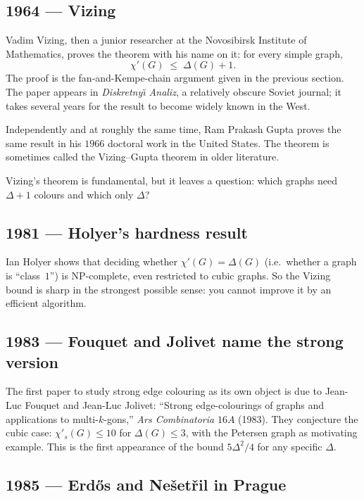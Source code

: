 \documentclass[11pt]{article}
\newcommand{\sci}{\chi'_s}
\begin{document}
\subsection*{1964 --- Vizing}

Vadim Vizing, then a junior researcher at the Novosibirsk Institute
of Mathematics, proves the theorem with his name on it: for every
simple graph,
\[
\chi'(G) \;\leq\; \Delta(G) + 1.
\]
The proof is the fan-and-Kempe-chain argument given in the previous
section. The paper appears in \emph{Diskretny\u\i{} Analiz}, a
relatively obscure Soviet journal; it takes several years for the
result to become widely known in the West.

Independently and at roughly the same time, Ram Prakash Gupta proves
the same result in his $1966$ doctoral work in the United States.
The theorem is sometimes called the Vizing--Gupta theorem in older
literature.

Vizing's theorem is fundamental, but it leaves a question: which
graphs need $\Delta + 1$ colours and which only $\Delta$?

\subsection*{1981 --- Holyer's hardness result}

Ian Holyer shows that deciding whether $\chi'(G) = \Delta(G)$ (i.e.\
whether a graph is ``class~$1$'') is NP-complete, even restricted to
cubic graphs. So the Vizing bound is sharp in the strongest possible
sense: you cannot improve it by an efficient algorithm.

\subsection*{1983 --- Fouquet and Jolivet name the strong version}

The first paper to study strong edge colouring as its own object is
due to Jean-Luc Fouquet and Jean-Luc Jolivet: ``Strong edge-colourings
of graphs and applications to multi-$k$-gons,'' \emph{Ars Combinatoria}
$16A$ (1983). They conjecture the cubic case: $\sci(G) \leq 10$ for
$\Delta(G) \leq 3$, with the Petersen graph as motivating example.
This is the first appearance of the bound $5\Delta^2/4$ for any
specific $\Delta$.

\subsection*{1985 --- Erd\H{o}s and Ne\v{s}et\v{r}il in Prague}
\end{document}
